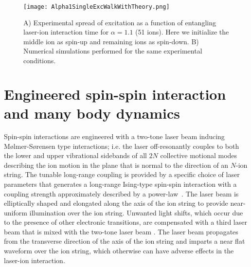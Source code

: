 \documentclass[aps,10pt,reprint,groupedaddress,superscriptaddress]{revtex4-2}
\begin{document}
\begin{figure*}
\centering
\texttt{[image: Alpha1SingleExcWalkWithTheory.png]}
\caption{A) Experimental spread of excitation as a function of entangling laser-ion interaction time for $\alpha =1.1$ (51 ions). Here we initialize the middle ion as spin-up and remaining ions as spin-down. B) Numerical simulations performed for the same experimental conditions.} \label{fig:SingleExcWalk}
\end{figure*}




\section{Engineered spin-spin interaction and many body dynamics }
Spin-spin interactions are engineered with a two-tone laser beam inducing M{\o}lmer-S{\o}rensen type interactions; i.e. the laser off-resonantly couples to both the lower and upper vibrational sidebands of all $2N$ collective motional modes describing the ion motion in the plane that is normal to the direction of an $N$-ion string. The tunable long-range coupling is provided by a specific choice of laser parameters that generates a long-range Ising-type spin-spin interaction with a coupling strength approximately described by a power-law~\cite{Porras_2004, Nevado_2016}. The laser beam is elliptically shaped and elongated along the axis of the ion string to provide near-uniform illumination over the ion string. Unwanted light shifts, which occur due to the presence of other electronic transitions, are compensated with a third laser beam that is mixed with the two-tone laser beam \cite{jurcevic_quasiparticle_2014}. The laser beam propagates from the transverse direction of the axis of the ion string and imparts a near flat waveform over the ion string, which otherwise can have adverse effects in the laser-ion interaction. 
\end{document}
